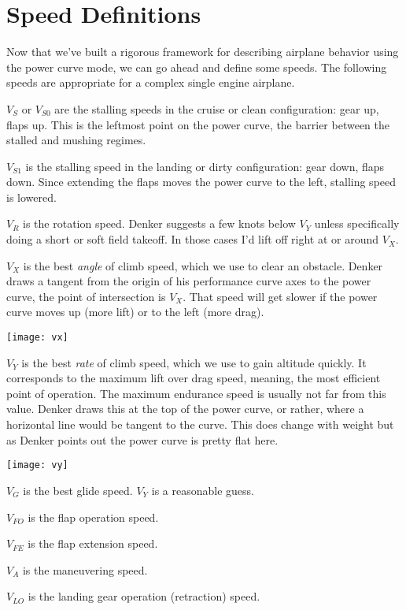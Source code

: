 \section{Speed Definitions}

Now that we've built a rigorous framework for describing airplane behavior using the power curve mode, we can go ahead and define some speeds. The following speeds are appropriate for a complex single engine airplane.

$V_S$ or $V_{S0}$ are the stalling speeds in the cruise or clean configuration: gear up, flaps up. This is the leftmost point on the power curve, the barrier between the stalled and mushing regimes.

$V_{S1}$ is the stalling speed in the landing or dirty configuration: gear down, flaps down. Since extending the flaps moves the power curve to the left, stalling speed is lowered.

$V_R$ is the rotation speed. Denker suggests a few knots below $V_Y$ unless specifically doing a short or soft field takeoff. In those cases I'd lift off right at or around $V_X$.

$V_X$ is the best \emph{angle} of climb speed, which we use to clear an obstacle. Denker draws a tangent from the origin of his performance curve axes to the power curve, the point of intersection is $V_X$. That speed will get slower if the power curve moves up (more lift) or to the left (more drag).

\texttt{[image: vx]}

$V_Y$ is the best \emph{rate} of climb speed, which we use to gain altitude quickly. It corresponds to the maximum lift over drag speed, meaning, the most efficient point of operation. The maximum endurance speed is usually not far from this value. Denker draws this at the top of the power curve, or rather, where a horizontal line would be tangent to the curve. This does change with weight but as Denker points out the power curve is pretty flat here.

\texttt{[image: vy]}

$V_G$ is the best glide speed. $V_Y$ is a reasonable guess.

$V_{FO}$ is the flap operation speed.

$V_{FE}$ is the flap extension speed.

$V_A$ is the maneuvering speed.

$V_{LO}$ is the landing gear operation (retraction) speed.

